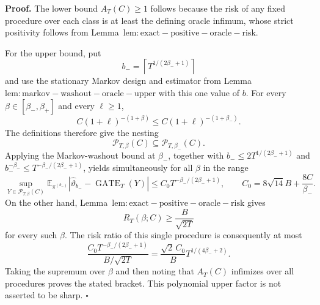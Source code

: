 \textbf{Proof.} The lower bound \(A_T(C)\ge1\) follows because the risk of any fixed procedure over each class is at least the defining oracle infimum, whose strict positivity follows from Lemma~\(\mathrm{lem:exact-positive-oracle-risk}\).

For the upper bound, put
\[
b_-=\left\lceil T^{1/(2\beta_-+1)}\right\rceil
\]
and use the stationary Markov design and estimator from Lemma~\(\mathrm{lem:markov-washout-oracle-upper}\) with this one value of \(b\). For every \(\beta\in[\beta_-,\beta_+]\) and every \(\ell\ge1\),
\[
C(1+\ell)^{-(1+\beta)}\le C(1+\ell)^{-(1+\beta_-)}.
\]
The definitions therefore give the nesting
\[
\mathcal P_{T,\beta}(C)\subseteq\mathcal P_{T,\beta_-}(C).
\]
Applying the Markov-washout bound at \(\beta_-\), together with \(b_-\le2T^{1/(2\beta_-+1)}\) and \(b_-^{-\beta_-}\le T^{-\beta_-/(2\beta_-+1)}\), yields simultaneously for all \(\beta\) in the range
\[
\sup_{Y\in\mathcal P_{T,\beta}(C)}
\mathbb E_{\pi^{(b_-)}}\left\lvert\widehat\vartheta_{b_-}-\operatorname{GATE}_T(Y)\right\rvert
\le C_0T^{-\beta_-/(2\beta_-+1)},
\qquad
C_0=8\sqrt{14}B+\frac{8C}{\beta_-}.
\]
On the other hand, Lemma~\(\mathrm{lem:exact-positive-oracle-risk}\) gives
\[
R_T(\beta;C)\ge\frac{B}{\sqrt{2T}}
\]
for every such \(\beta\). The risk ratio of this single procedure is consequently at most
\[
\frac{C_0T^{-\beta_-/(2\beta_-+1)}}{B/\sqrt{2T}}
=\frac{\sqrt2\,C_0}{B}T^{1/(4\beta_-+2)}.
\]
Taking the supremum over \(\beta\) and then noting that \(A_T(C)\) infimizes over all procedures proves the stated bracket. This polynomial upper factor is not asserted to be sharp. \(\square\)
